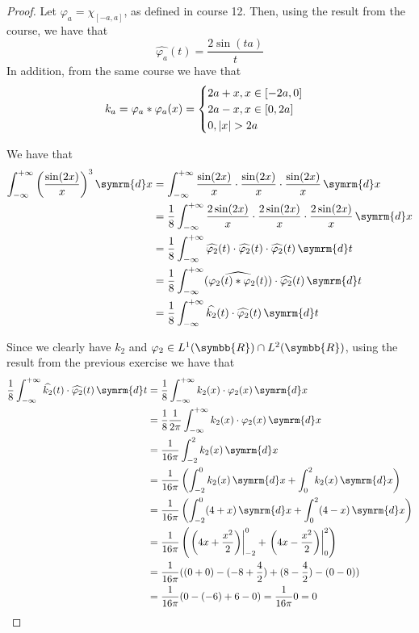 \documentclass[a4paper, 12pt]{article}
\DeclarePairedDelimiter\abs{\lvert}{\rvert}%
\newcommand*\diff{\mathop{}\!\symrm{d}}
\newcommand*{\reals}{\symbb{R}}
\begin{document}
\begin{proof}
Let \(\varphi_{a} = \chi_{[-a, a]}\), as defined in course 12. Then, using the result from the course, we have that
\[
    \widehat{\varphi_{a}} (t) = \frac{2 \sin (ta)}{t}
\]
In addition, from the same course we have that
\[
    k_a = \varphi_{a} * \varphi_{a} (x) = \begin{cases}
        2a + x, x \in [-2a, 0] \\
        2a - x, x \in [0, 2a] \\
        0, \abs{x} > 2a
    \end{cases}
\]

We have that
\begin{align*}
    \int_{-\infty}^{+\infty} \left(\frac{\sin (2x)}{x}\right)^3 \diff x &= \int_{-\infty}^{+\infty} \frac{\sin (2x)}{x} \cdot \frac{\sin (2x)}{x} \cdot \frac{\sin (2x)}{x} \diff x \\
    &= \frac{1}{8} \int_{-\infty}^{+\infty} \frac{2 \sin (2x)}{x} \cdot \frac{2 \sin (2x)}{x} \cdot \frac{2 \sin (2x)}{x} \diff x \\
    &= \frac{1}{8} \int_{-\infty}^{+\infty} \widehat{\varphi_2}(t) \cdot \widehat{\varphi_2}(t) \cdot \widehat{\varphi_2}(t) \diff t \\
    &= \frac{1}{8} \int_{-\infty}^{+\infty} (\widehat{\varphi_2 (t) * \varphi_2 (t)}) \cdot \widehat{\varphi_2} (t) \diff t \\
    &= \frac{1}{8} \int_{-\infty}^{+\infty} \widehat{k_2} (t) \cdot \widehat{\varphi_2} (t) \diff t
\end{align*}

Since we clearly have \(k_2\) and \(\varphi_2 \in L^1 (\reals) \cap L^2 (\reals)\), using the result from the previous exercise we have that
\begin{align*}
    \frac{1}{8} \int_{-\infty}^{+\infty} \widehat{k_2} (t) \cdot \widehat{\varphi_2} (t) \diff t &= \frac{1}{8} \int_{-\infty}^{+\infty} k_2 (x) \cdot \varphi_2 (x) \diff x
    \\
    &= \frac{1}{8} \frac{1}{2\pi} \int_{-\infty}^{+\infty} k_2 (x) \cdot \varphi_2 (x) \diff x \\
    &= \frac{1}{16 \pi} \int_{-2}^{2} k_2 (x) \diff x \\
    &= \frac{1}{16 \pi} \left(\int_{-2}^{0} k_2 (x) \diff x + \int_{0}^{2} k_2(x) \diff x\right) \\
    &= \frac{1}{16 \pi} \left(\int_{-2}^{0} (4 + x) \diff x + \int_{0}^{2} (4 - x) \diff x\right) \\
    &= \frac{1}{16\pi} \left(\left.\left(4x + \frac{x^2}{2}\right)\right|_{-2}^{0} + \left.\left(4x - \frac{x^2}{2}\right)\right|_{0}^{2}\right) \\
    &= \frac{1}{16\pi} ((0 + 0) - (-8 + \frac{4}{2}) + (8 - \frac{4}{2}) - (0 - 0)) \\
    &= \frac{1}{16\pi} (0 - (-6) + 6 - 0) = \frac{1}{16\pi} 0 = 0
\end{align*}
\end{proof}
\end{document}
